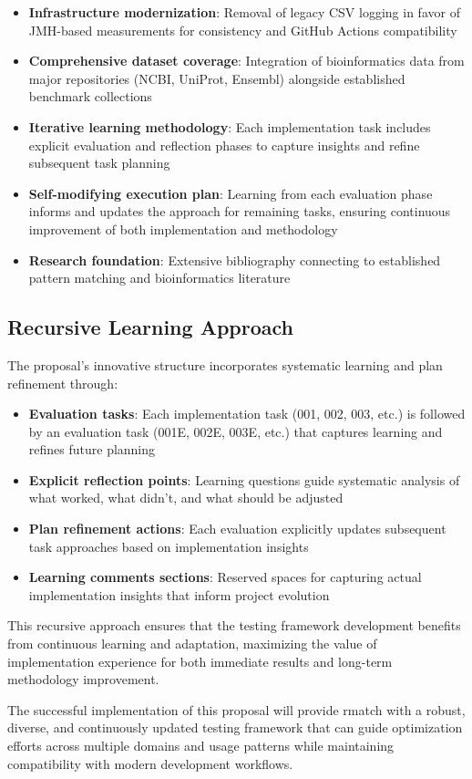 \documentclass[11pt,a4paper]{article}
\begin{document}
\begin{itemize}
    \item \textbf{Infrastructure modernization}: Removal of legacy CSV logging in favor of JMH-based measurements for consistency and GitHub Actions compatibility
    \item \textbf{Comprehensive dataset coverage}: Integration of bioinformatics data from major repositories (NCBI, UniProt, Ensembl) alongside established benchmark collections
    \item \textbf{Iterative learning methodology}: Each implementation task includes explicit evaluation and reflection phases to capture insights and refine subsequent task planning
    \item \textbf{Self-modifying execution plan}: Learning from each evaluation phase informs and updates the approach for remaining tasks, ensuring continuous improvement of both implementation and methodology
    \item \textbf{Research foundation}: Extensive bibliography connecting to established pattern matching and bioinformatics literature
\end{itemize}

\subsection{Recursive Learning Approach}

The proposal's innovative structure incorporates systematic learning and plan refinement through:

\begin{itemize}
    \item \textbf{Evaluation tasks}: Each implementation task (001, 002, 003, etc.) is followed by an evaluation task (001E, 002E, 003E, etc.) that captures learning and refines future planning
    \item \textbf{Explicit reflection points}: Learning questions guide systematic analysis of what worked, what didn't, and what should be adjusted
    \item \textbf{Plan refinement actions}: Each evaluation explicitly updates subsequent task approaches based on implementation insights
    \item \textbf{Learning comments sections}: Reserved spaces for capturing actual implementation insights that inform project evolution
\end{itemize}

This recursive approach ensures that the testing framework development benefits from continuous learning and adaptation, maximizing the value of implementation experience for both immediate results and long-term methodology improvement.

The successful implementation of this proposal will provide rmatch with a robust, diverse, and continuously updated testing framework that can guide optimization efforts across multiple domains and usage patterns while maintaining compatibility with modern development workflows.



\end{document}
